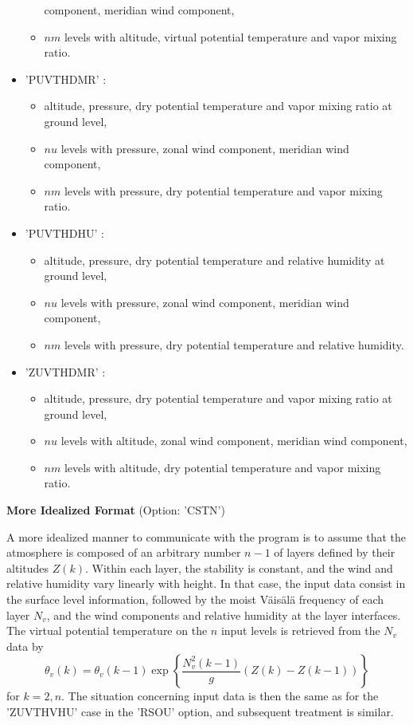 \begin{itemize}
\begin{itemize}
component, meridian wind component, \item  $nm$ levels with   altitude, virtual potential temperature
and vapor mixing ratio. \end{itemize}
\item 'PUVTHDMR'  : \begin{itemize} \item   altitude, pressure, dry potential temperature
and vapor mixing ratio at ground level, \item  $nu$ levels with pressure, zonal wind
component, meridian wind component, \item  $nm$ levels with pressure,
dry potential temperature and vapor mixing ratio.\end{itemize}
\item 'PUVTHDHU'  : \begin{itemize} \item altitude, pressure, dry potential temperature
and relative humidity at ground level, \item  $nu$ levels with pressure, zonal wind
component, meridian wind component, \item  $nm$ levels with pressure,
dry potential temperature and relative humidity.\end{itemize}
\item 'ZUVTHDMR'  : \begin{itemize} \item   altitude, pressure, dry potential temperature
and vapor mixing ratio at ground level, \item  $nu$ levels with  altitude, zonal wind
component, meridian wind component, \item  $nm$ levels with  altitude,
dry potential temperature and vapor mixing ratio.\end{itemize}
\end{itemize}

{\bf More Idealized Format} (Option: 'CSTN')

A more idealized manner to communicate with the program is to assume that
the atmosphere is composed of an arbitrary number $n-1$ of layers defined
by their altitudes $Z(k)$. Within each layer,
the stability is constant, and the wind and relative humidity vary linearly
with height. In that case, the input data consist in the surface level
information, followed by the moist V\"ais\"al\"a frequency of each layer
$N_v$, and the wind components and relative humidity at the layer
interfaces.
The virtual potential temperature on the $n$ input levels is retrieved
from the $N_{v}$ data by
\begin{equation}
\theta_{v}(k)  = \theta_{v}(k-1) \exp\left\{ \dfrac{N_{v}^{2}(k-1)}{g}
\left( Z(k)-Z(k-1) \right) \right\}
\end{equation}
for $k=2,n$. The situation concerning input data is then the same as for
the 'ZUVTHVHU' case in the 'RSOU' option, and subsequent treatment is similar.

